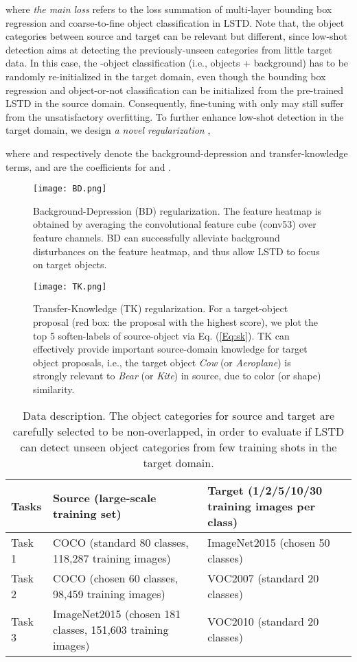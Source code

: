 \documentclass[letterpaper]{article} \usepackage{aaai18}  \usepackage{times}  \usepackage{helvet}  \usepackage{courier}  \usepackage{url}  \usepackage{graphicx}
\begin{document}
where
\textit{the main loss}  refers to the loss summation of multi-layer bounding box regression and coarse-to-fine object classification in LSTD.
Note that,
the object categories between source and target can be relevant but different,
since low-shot detection aims at detecting the previously-unseen categories from little target data.
In this case,
the -object classification (i.e.,  objects + background) has to be randomly re-initialized in the target domain,
even though the bounding box regression and object-or-not classification can be initialized from the pre-trained LSTD in the source domain.
Consequently,
fine-tuning with only  may still suffer from the unsatisfactory overfitting.
To further enhance low-shot detection in the target domain,
we design \textit{a novel regularization} ,

where
 and  respectively denote the background-depression and transfer-knowledge terms,
 and  are the coefficients for  and .



\begin{figure}[t]
\centering
\texttt{[image: BD.png]}
\caption{Background-Depression (BD) regularization.
The feature heatmap is obtained by averaging the convolutional feature cube (conv53) over feature channels.
BD can successfully alleviate background disturbances on the feature heatmap,
and thus allow LSTD to focus on target objects.}
\label{BDRegularization}
\end{figure}


\begin{figure}[t]
\centering
\texttt{[image: TK.png]}
\caption{Transfer-Knowledge (TK) regularization.
For a target-object proposal (red box: the proposal with the highest score),
we plot the top 5 soften-labels of source-object via Eq. (\ref{Eq:sk}).
TK can effectively provide important source-domain knowledge for target object proposals,
i.e.,
the target object \textit{Cow} (or \textit{Aeroplane}) is strongly relevant to \textit{Bear} (or \textit{Kite}) in source,
due to color (or shape) similarity.}
\label{TKRegularization}
\end{figure}

\begin{table*}[t]
\centering
\begin{tabular}{l|l|l}
  \hline
Tasks & Source (large-scale training set) & Target (1/2/5/10/30 training images per class) \\
  \hline
  Task 1 & COCO (standard 80 classes, 118,287 training images) &  ImageNet2015 (chosen 50 classes) \\
  Task 2& COCO (chosen 60 classes, 98,459 training images)   &  VOC2007 (standard 20 classes) \\
  Task 3& ImageNet2015 (chosen 181 classes, 151,603 training images) & VOC2010 (standard 20 classes) \\
  \hline
\end{tabular}
\caption{Data description.
The object categories for source and target are carefully selected to be non-overlapped,
in order to evaluate if LSTD can detect unseen object categories from few training shots in the target domain.}
\label{DataDescription}
\end{table*}
\end{document}
